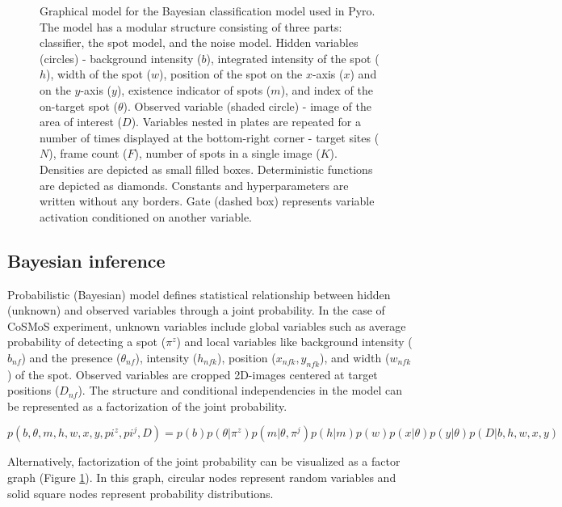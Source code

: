 \begin{figure}[ht]
  \begin{center}
    
  \end{center}
  \caption{Graphical model for the Bayesian classification model used in Pyro. The model has a modular structure consisting of three parts: classifier, the spot model, and the noise model. Hidden variables (circles) - background intensity ($b$), integrated intensity of the spot ($h$), width of the spot ($w$), position of the spot on the $x$-axis ($x$) and on the $y$-axis ($y$), existence indicator of spots ($m$), and index of the on-target spot ($\theta$). Observed variable (shaded circle) - image of the area of interest ($D$). Variables nested in plates are repeated for a number of times displayed at the bottom-right corner - target sites ($N$), frame count ($F$), number of spots in a single image ($K$). Densities are depicted as  small filled boxes. Deterministic functions are depicted as diamonds. Constants and hyperparameters are written without any borders. Gate (dashed box) represents variable activation conditioned on another variable.}
  \label{fig:graph}
\end{figure}

\subsection{Bayesian inference}

Probabilistic (Bayesian) model defines statistical relationship between hidden (unknown) and observed variables through a joint probability. In the case of CoSMoS experiment, unknown variables include global variables such as average probability of detecting a spot ($\pi^z$) and local variables like background intensity ($b_{nf}$) and the presence ($\theta_{nf}$), intensity ($h_{nfk}$), position ($x_{nfk}, y_{nfk}$), and width ($w_{nfk}$) of the spot. Observed variables are cropped 2D-images centered at target positions ($D_{nf}$). The structure and conditional independencies in the model can be represented as a factorization of the joint probability.

\textbf{\begin{equation*}
    p(b,\theta,m,h,w,x,y,pi^z,pi^j,D) = p(b)p(\theta|\pi^z)p(m|\theta,\pi^j)p(h|m)p(w)p(x|\theta)p(y|\theta)p(D|b,h,w,x,y)
\end{equation*}}


Alternatively, factorization of the joint probability can be visualized as a factor graph (Figure \ref{fig:graph}). In this graph, circular nodes represent random variables and solid square nodes represent probability distributions.

